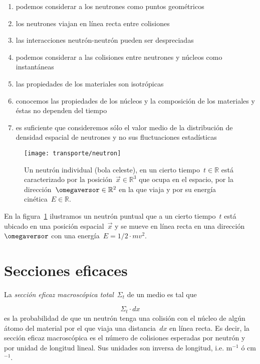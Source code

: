 \begin{enumerate}
 \item podemos considerar a los neutrones como puntos geométricos
 \item los neutrones viajan en línea recta entre colisiones
 \item las interacciones neutrón-neutrón pueden ser despreciadas
 \item podemos considerar a las colisiones entre neutrones y núcleos como instantáneas
 \item las propiedades de los materiales son isotrópicas
 \item conocemos las propiedades de los núcleos y la composición de los materiales y éstas no dependen del tiempo
 \item es suficiente que consideremos sólo el valor medio de la distribución de densidad espacial de neutrones y no sus fluctuaciones estadísticas
 \end{enumerate}

\begin{figure}
 \begin{center}
  \texttt{[image: transporte/neutron]}
 \end{center}
\caption{\label{fig:neutron}Un neutrón individual (bola celeste), en un cierto tiempo~$t \in \mathbb{R}$ está caracterizado por la posición~$\vec{x}\in \mathbb{R}^3$ que ocupa en el espacio, por la dirección~$\omegaversor \in \mathbb{R}^2$ en la que viaja y por su energía cinética~$E\in\mathbb{R}$.}
\end{figure}

En la figura~\ref{fig:neutron} ilustramos un neutrón puntual que a un cierto tiempo~$t$ está ubicado en una posición espacial~$\vec{x}$ y se mueve en línea recta en una dirección~$\omegaversor$ con una energía~$E=1/2 \cdot m v^2$.

\section{Secciones eficaces} %

{\color{red}\lipsum[3]}

\begin{definicion}
\label{def:sigmat}
La \emph{sección eficaz macroscópica total}~$\Sigma_t$ de un medio es tal que

\begin{equation*}
\Sigma_t \cdot dx 
\end{equation*}
%
es la probabilidad de que un neutrón tenga una colisión con el núcleo de algún átomo del material por el que viaja una distancia~$dx$ en línea recta. Es decir, la sección eficaz macroscópica es el número de colisiones esperadas por neutrón y por unidad de longitud lineal. Sus unidades son inversa de longitud, i.e. m$^{-1}$ ó cm$^{-1}$. 
\end{definicion}


